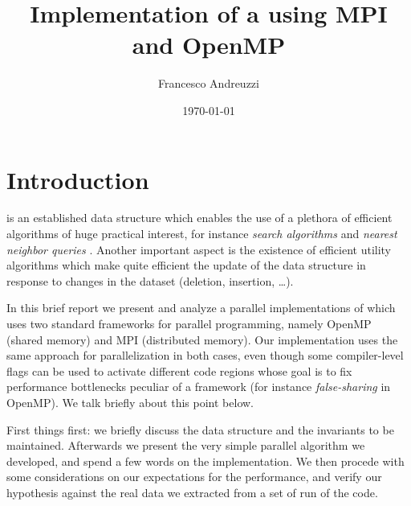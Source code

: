 \documentclass{article}
\title{Implementation of a \kdtree{} using MPI and OpenMP}
\author{Francesco Andreuzzi}
\date{\today}
\begin{document}
\maketitle

\tableofcontents


\section{Introduction} \label{sec:intro}
\kdtree{} is an established data structure which enables the use of a
plethora of efficient algorithms of huge practical interest, for instance
\emph{search algorithms} and \emph{nearest neighbor queries}
\cite{bentley1975multidimensional}. Another important aspect is the existence of
efficient utility algorithms which make quite efficient the update of the data
structure in response to changes in the dataset (deletion, insertion, \dots).

In this brief report we present and analyze a parallel implementations of
\kdtree{} which uses two standard frameworks for parallel programming, namely
OpenMP (shared memory) and MPI (distributed
memory). Our implementation uses the same approach for parallelization in
both cases, even though some compiler-level flags can be used to activate
different code regions whose goal is to fix performance bottlenecks peculiar of
a framework (for instance \emph{false-sharing} in OpenMP). We talk
briefly about this point below.

First things first: we briefly discuss the data structure and the invariants to
be maintained. Afterwards we present the very simple parallel algorithm we
developed, and spend a few words on the implementation. We then procede with
some considerations on our expectations for the performance, and verify our
hypothesis against the real data we extracted from a set of run of the code.
\end{document}
